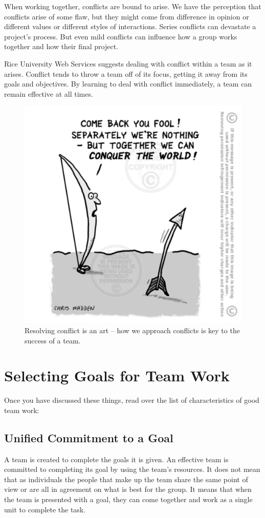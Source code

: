 \documentclass{article}\usepackage[]{graphicx}\usepackage[]{color}
\begin{document}
When working together, conflicts are bound to arise. We have the perception that conflicts arise of some flaw, but they might come from difference in opinion or different values or different styles of interactions. Series conflicts can devastate a project's process. But even mild conflicts can influence how a group works together and how their final project.

Rice University Web Services suggests dealing with conflict within a team as it arises. Conflict tends to throw a team off of its focus, getting it away from its goals and objectives. By learning to deal with conflict immediately, a team can remain effective at all times.

\begin{figure}
\includegraphics[width=.50\textwidth]{../graphics/Bow-arrow-conquer-world}
\caption{Resolving conflict is an art -- how we approach conflicts is key to the success of a team.}
\end{figure}

\section{Selecting Goals for Team Work} 

Once you have discussed these things, read over the list of characteristics of good team work: 

\subsection{Unified Commitment to a Goal}
A team is created to complete the goals it is given. An effective team is committed to completing its goal by using the team's resources. It does not mean that as individuals the people that make up the team share the same point of view or are all in agreement on what is best for the group. It means that when the team is presented with a goal, they can come together and work as a single unit to complete the task.
\end{document}
